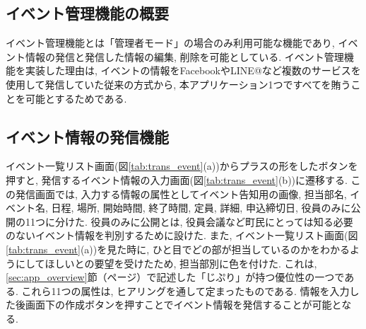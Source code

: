 \subsection{イベント管理機能の概要}%
イベント管理機能とは「管理者モード」の場合のみ利用可能な機能であり, イベント情報の発信と発信した情報の編集, 削除を可能としている. イベント管理機能を実装した理由は, イベントの情報をFacebookやLINE@など複数のサービスを使用して発信していた従来の方式から, 本アプリケーション1つですべてを賄うことを可能とするためである.

\subsection{イベント情報の発信機能}%
\label{subsec:event_add}
イベント一覧リスト画面(図\ref{tab:trans_event}(a))からプラスの形をしたボタンを押すと, 発信するイベント情報の入力画面(図\ref{tab:trans_event}(b))に遷移する. この発信画面では, 入力する情報の属性としてイベント告知用の画像, 担当部名, イベント名, 日程, 場所, 開始時間, 終了時間, 定員, 詳細, 申込締切日, 役員のみに公開の11つに分けた. 役員のみに公開とは, 役員会議など町民にとっては知る必要のないイベント情報を判別するために設けた. また, イベント一覧リスト画面(図\ref{tab:trans_event}(a))を見た時に, ひと目でどの部が担当しているのかをわかるようにしてほしいとの要望を受けたため, 担当部別に色を付けた. これは, \ref{sec:app_overview}節（\pageref{sec:app_overview}ページ）で記述した「じぷり」が持つ優位性の一つである. これら11つの属性は, ヒアリングを通して定まったものである. 情報を入力した後画面下の作成ボタンを押すことでイベント情報を発信することが可能となる.

